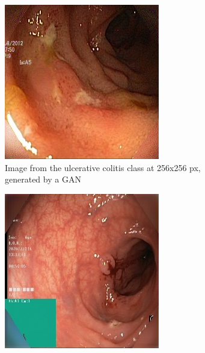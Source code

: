 \begin{figure}
\begin{subfigure}[t]{0.4\textwidth}
            \includegraphics[width=\textwidth]{experiments/figures/blackcorner/ucGAN.jpg}
            \caption{ Image from the ulcerative colitis class at 256x256 px, generated by a GAN}   
            \label{fig:polyp_GAN_CORNER2}
        \end{subfigure}
        \qquad\vfill%
        \begin{subfigure}[t]{0.4\textwidth}   
            \centering 
            \includegraphics[width=\textwidth]{experiments/figures/blackcorner/polypwithgreenAE.jpg}

\end{subfigure}
\end{figure}
